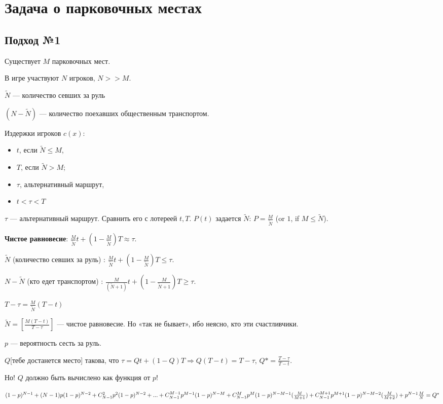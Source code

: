 \chapter{Задача о парковочных местах}

\section{Подход №1}

Существует $M$ парковочных мест.

В игре участвуют $N$ игроков, $N >> M$.

$\tilde N$ --- количество севших за руль

$(N - \tilde N)$ --- количество поехавших общественным транспортом.

Издержки игроков $c(x)$:
\begin{itemize}
 \item  $t$, если $\tilde N\le M$,
 \item  $T$, если $\tilde N>M$;
 \item  $\tau$, альтернативный маршрут,
 \item  $t<\tau<T$
\end{itemize}

$\tau$ — альтернативный маршрут.
Сравнить его с лотереей ${t,T}$.
$P(t)$ задается $\tilde N$: $P=\frac{M}{\tilde{N}}$ (or $1$, if $M \le \tilde N$).

\textbf{Чистое равновесие}: $\frac{M}{\tilde N}t+(1-\frac{M}{\tilde{N}})T\approx\tau$.


$\tilde{N}$ (количество севших за руль) : $\frac{M}{\tilde{N}}t+(1-\frac{M}{\tilde{N}})T\le\tau$.

${N-\tilde N}$ (кто едет транспортом) : $\frac{M}{(\tilde{N}+1)}t+(1-\frac{M}{\tilde{N}+1})T\ge\tau$.

$T-\tau = \frac{M}{\tilde{N}}(T-t)$

$\tilde{N}=[\frac{M(T-t)}{T-\tau}]$ — чистое равновесие. Но «так не бывает», ибо неясно, кто эти счастливчики.

$p$ — вероятность сесть за руль.

$Q$[тебе достанется место] такова, что $\tau = Qt+(1-Q)T \Rightarrow Q(T-t)=T-\tau$, $Q*=\frac{T-\tau}{T-t}$.

Но! $Q$ должно быть вычислено как функция от $p$!

$(1-p)^{N-1} + \\ (N-1)p(1-p)^{N-2} + \\ C_{N-1}^2 p^2(1-p)^{N-2} + ... + \\ C_{N-1}^{M-1}p^{M-1}(1-p)^{N-M} + \\ C_{N-1}^{M}p^M(1-p)^{N-M-1}(\frac{M}{M+1}) + \\ C_{N-1}^{M+1}p^{M+1}(1-p)^{N-M-2}(\frac{M}{M+2}) + \\ p^{N-1}\frac{M}{N} = \\ Q^*$


